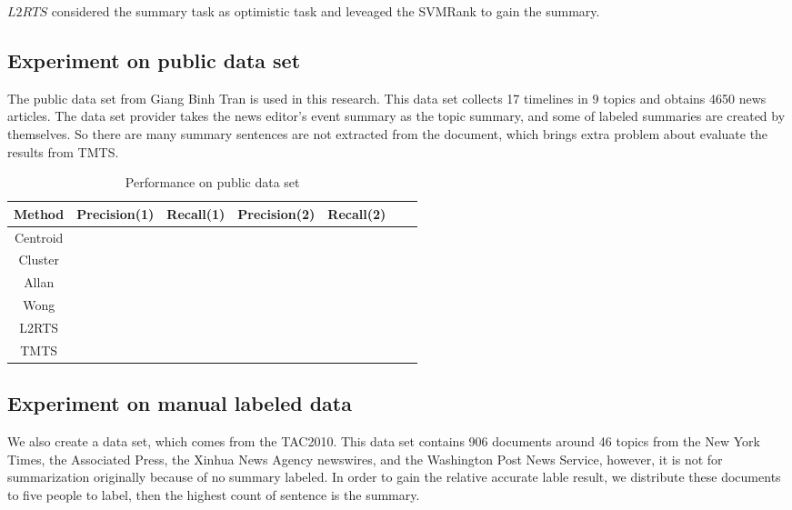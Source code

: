 \documentclass{llncs}
\begin{document}
$L2RTS$ considered the summary task as optimistic task and  leveaged the SVMRank to gain the summary.

\subsection{Experiment on public data set}

The public data set from Giang Binh Tran\cite{tran2013leveraging} is used in this research. This data set collects 17 timelines in 9 topics and obtains 4650 news articles. The data set provider takes the news editor's event summary as the topic summary, and some of labeled summaries are created by themselves. So there are many summary sentences are not extracted from the document, which brings extra problem about evaluate the results from TMTS.

\begin{table}
\caption{Performance on public data set}
\begin{tabular}{|c|c|c|c|c|c|c|}
\hline
Method  & Precision(1) & Recall(1)& Precision(2) & Recall(2) \\
\hline
Centroid &				& 			 			&				& 			 				\\
\hline
Cluster	&				&						&				& 			 				\\
\hline
Allan		&				&						&				& 			 				\\
\hline
Wong		&				&						&				& 							\\
\hline
L2RTS	&				&						&				& 			 				\\
\hline
TMTS	&				&						&				& 							\\
\hline
\end{tabular}
\end{table}

\subsection{Experiment on manual labeled data}

We also create a data set, which comes from the TAC2010. This data set contains 906 documents around 46 topics from the New York Times, the Associated Press, the Xinhua News Agency newswires, and the Washington Post News Service, however, it is not for summarization originally because of no summary labeled. In order to gain the relative accurate lable result, we distribute these documents to five people to label, then the highest count of sentence is the summary.
\end{document}
